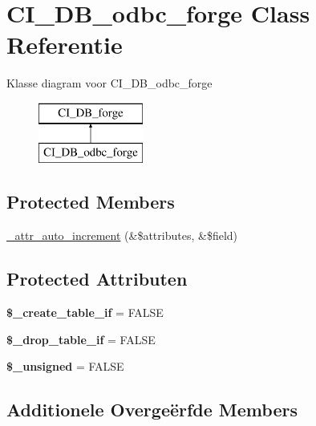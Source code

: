 \hypertarget{class_c_i___d_b__odbc__forge}{}\section{C\+I\+\_\+\+D\+B\+\_\+odbc\+\_\+forge Class Referentie}
\label{class_c_i___d_b__odbc__forge}
Klasse diagram voor C\+I\+\_\+\+D\+B\+\_\+odbc\+\_\+forge\begin{figure}[H]
\begin{center}
\leavevmode
\includegraphics[height=2.000000cm]{class_c_i___d_b__odbc__forge}
\end{center}
\end{figure}
\subsection*{Protected Members}
\begin{DoxyCompactItemize}
\item 
\mbox{\hyperlink{class_c_i___d_b__odbc__forge_a2a013a5932439c3c44f0dad3436525f7}{\+\_\+attr\+\_\+auto\+\_\+increment}} (\&\$attributes, \&\$field)
\end{DoxyCompactItemize}
\subsection*{Protected Attributen}
\begin{DoxyCompactItemize}
\item 
\mbox{\label{class_c_i___d_b__odbc__forge_a2f6484fcb8d1dc3eef67a637227cd583}} 
{\bfseries \$\+\_\+create\+\_\+table\+\_\+if} = F\+A\+L\+SE
\item 
\mbox{\label{class_c_i___d_b__odbc__forge_a92a8a9145a7fc91e252e58d019373581}} 
{\bfseries \$\+\_\+drop\+\_\+table\+\_\+if} = F\+A\+L\+SE
\item 
\mbox{\label{class_c_i___d_b__odbc__forge_aae977ae6d61fa183f0b25422b6ddc31c}} 
{\bfseries \$\+\_\+unsigned} = F\+A\+L\+SE
\end{DoxyCompactItemize}
\subsection*{Additionele Overge\"{e}rfde Members}


